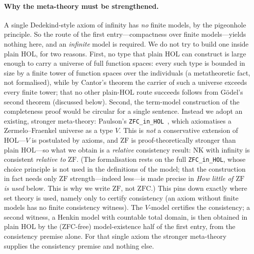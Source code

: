 \documentclass[11pt,a4paper]{article}
\begin{document}
\paragraph{Why the meta-theory must be strengthened.}
A single Dedekind-style axiom of infinity has \emph{no} finite models, by the
pigeonhole principle.  So the route of the first entry---compactness over
finite models---yields nothing here, and an \emph{infinite} model is
required.  We do not try to build one inside plain HOL, for two reasons.
First, no type that plain HOL can construct is large enough to carry a
universe of full function spaces: every such type is bounded in size by a
finite tower of function spaces over the individuals (a metatheoretic fact,
not formalised), while by Cantor's theorem the carrier of such a universe
exceeds every finite tower; that no other plain-HOL route succeeds follows
from G\"odel's second theorem (discussed below).  Second, the term-model construction of the completeness proof would
be circular for a single sentence.  Instead we adopt an existing, stronger
meta-theory: Paulson's \texttt{ZFC\_in\_HOL}~\cite{ZFCinHOL}, which
axiomatises a Zermelo--Fraenkel universe as a type $V$.  This is \emph{not} a
conservative extension of HOL---$V$ is postulated by axioms, and $\mathrm{ZF}$
is proof-theoretically stronger than plain HOL---so what we obtain is a
\emph{relative} consistency result: $\mathrm{NK}$ with infinity is consistent
\emph{relative to} $\mathrm{ZF}$.  (The formalisation rests on the full
\texttt{ZFC\_in\_HOL}, whose choice principle is not used in the
definitions of the model; that the
construction in fact needs only $\mathrm{ZF}$ strength---indeed less---is made
precise in \emph{How little of $\mathrm{ZF}$ is used} below.  This is why we
write $\mathrm{ZF}$, not $\mathrm{ZFC}$.)  This pins down exactly where set theory is
used, namely only to certify consistency (an axiom without finite models has
no finite consistency witness).  The $V$-model certifies the consistency; a
second witness, a Henkin model with countable total domain, is then obtained
in plain HOL by the (ZFC-free) model-existence half of the first entry, from
the consistency premise alone.  For that single axiom the stronger meta-theory
supplies the consistency premise and nothing else.
\end{document}

